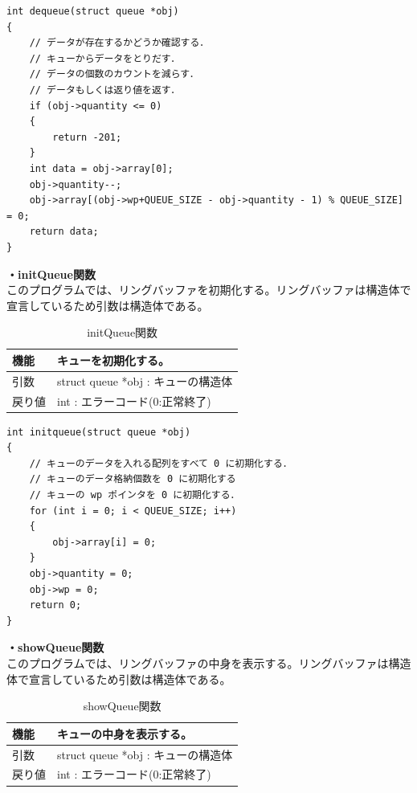 \documentclass[dvipdfmx]{jsarticle}
\begin{document}
\begin{lstlisting}[caption={dequeue関数}, label={lst:dequeue_func_2}]
int dequeue(struct queue *obj)
{
    // データが存在するかどうか確認する．
    // キューからデータをとりだす．
    // データの個数のカウントを減らす．
    // データもしくは返り値を返す．
    if (obj->quantity <= 0)
    {
        return -201;
    }
    int data = obj->array[0];
    obj->quantity--;
    obj->array[(obj->wp+QUEUE_SIZE - obj->quantity - 1) % QUEUE_SIZE] = 0;
    return data;
}
\end{lstlisting}
\textbf{・initQueue関数}\\
このプログラムでは、リングバッファを初期化する。リングバッファは構造体で宣言しているため引数は構造体である。
\begin{table}[ht]
  \centering
  \caption{initQueue関数}
  \begin{tabular}{|p{5cm}|p{10cm}|}
    \hline
    機能  & キューを初期化する。                                      \\
    \hline
    引数  & struct queue *obj : キューの構造体 \\
    \hline
    戻り値 & int : エラーコード(0:正常終了) \\
    \hline
  \end{tabular}
  \label{tab:initQueue_func_2}
\end{table}
\begin{lstlisting}[caption={initQueue関数}, label={lst:initQueue_func_2}]
int initqueue(struct queue *obj)
{
    // キューのデータを入れる配列をすべて 0 に初期化する．
    // キューのデータ格納個数を 0 に初期化する
    // キューの wp ポインタを 0 に初期化する．
    for (int i = 0; i < QUEUE_SIZE; i++)
    {
        obj->array[i] = 0;
    }
    obj->quantity = 0;
    obj->wp = 0;
    return 0;
}
\end{lstlisting}
\textbf{・showQueue関数}\\
このプログラムでは、リングバッファの中身を表示する。リングバッファは構造体で宣言しているため引数は構造体である。
\begin{table}[ht]
  \centering
  \caption{showQueue関数}
  \begin{tabular}{|p{5cm}|p{10cm}|}
    \hline
    機能  & キューの中身を表示する。                                      \\
    \hline
    引数  & struct queue *obj : キューの構造体 \\
    \hline
    戻り値 & int : エラーコード(0:正常終了) \\
    \hline
  \end{tabular}
  \label{tab:showQueue_func_2}
\end{table}
\end{document}
